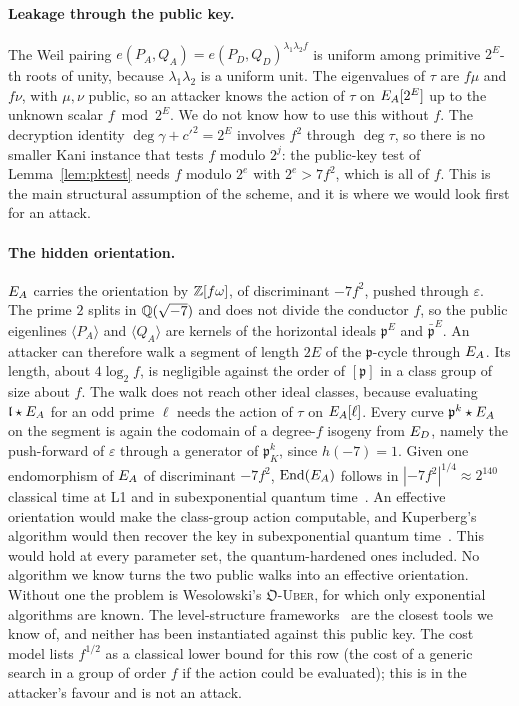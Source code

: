 \paragraph{Leakage through the public key.} The Weil pairing
$e(P_A,Q_A)=e(P_D,Q_D)^{\lambda_1\lambda_2f}$ is uniform among primitive
$2^E$-th roots of unity, because $\lambda_1\lambda_2$ is a uniform unit.
The eigenvalues of $\tau$ are $f\mu$ and $f\nu$, with $\mu,\nu$ public, so an
attacker knows the action of $\tau$ on $E_A[2^E]$ up to the unknown scalar
$f\bmod 2^E$. We do not know how to use this without $f$. The decryption
identity $\deg\gamma+c'^2=2^E$ involves $f^2$ through $\deg\tau$, so there is
no smaller Kani instance that tests $f$ modulo $2^j$: the public-key test
of Lemma~\ref{lem:pktest} needs $f$ modulo $2^e$ with $2^e>7f^2$, which is all
of $f$. This is the main structural assumption of the scheme, and it is where
we would look first for an attack.

\paragraph{The hidden orientation.} $E_A$ carries the orientation by
$\mathbb{Z}[f\omega]$, of discriminant $-7f^2$, pushed through $\varepsilon$. The
prime $2$ splits in $\mathbb{Q}(\sqrt{-7})$ and does not divide the conductor
$f$, so the public eigenlines $\langle P_A\rangle$ and $\langle Q_A\rangle$
are kernels of the horizontal ideals $\mathfrak p^E$ and $\bar{\mathfrak p}^E$.
An attacker can therefore walk a segment of length $2E$ of the
$\mathfrak p$-cycle through $E_A$. Its length, about $4\log_2f$, is
negligible against the order of $[\mathfrak p]$ in a class group of size
about $f$. The walk does not reach other ideal classes, because evaluating
$\mathfrak l\star E_A$ for an odd prime $\ell$ needs the action of $\tau$ on
$E_A[\ell]$. Every curve $\mathfrak p^k\star E_A$ on the segment is again the
codomain of a degree-$f$ isogeny from $E_D$, namely the push-forward of
$\varepsilon$ through a generator of $\mathfrak p_K^k$, since $h(-7)=1$. Given
one endomorphism of $E_A$ of discriminant $-7f^2$, $\operatorname{End}(E_A)$ follows in
$|{-7f^2}|^{1/4}\approx2^{140}$ classical time at L1 and in subexponential
quantum time~\cite{HLMW23}. An effective orientation would make the
class-group action computable, and Kuperberg's algorithm would then recover
the key in subexponential quantum time~\cite{Wes21orient}. This would hold at
every parameter set, the quantum-hardened ones included. No algorithm we know
turns the two public walks into an effective orientation. Without one the
problem is Wesolowski's $\mathfrak O$-\textsc{Uber}, for which only
exponential algorithms are known. The level-structure
frameworks~\cite{DFP24,Arpin24} are the closest tools we know of, and neither
has been instantiated against this public key. The cost model lists
$f^{1/2}$ as a classical lower bound for this row (the cost of a generic
search in a group of order $f$ if the action could be evaluated); this is in
the attacker's favour and is not an attack.

